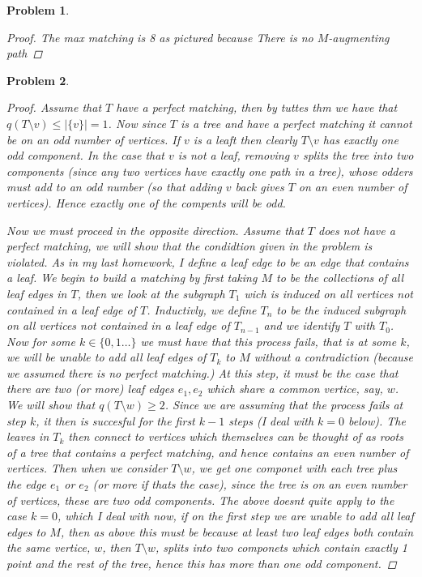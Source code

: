 \documentclass{article}
\newtheorem{prb}{Problem}
\begin{document}
\begin{prb} 
	\begin{proof} 
		The max matching is 8 as pictured because There is no $M$-augmenting path	\end{proof}
\end{prb} 
\newpage
\begin{prb} 
	\begin{proof} 
	Assume that $T$ have a perfect matching, then by tuttes thm we have that $q(T \setminus v) \leq |\{v\}| = 1$. 
	Now since $T$ is a tree and have a perfect matching it cannot be on an odd number of vertices. If $v$ is a leaft 
	then clearly $T \setminus v$ has exactly one odd component. In the case that $v$ is not a leaf, removing $v$ splits the 
	tree into two components (since any two vertices have exactly one path in a tree), whose odders must add to an odd number 
	(so that adding $v$ back gives $T$ on an even number of vertices). Hence exactly one of the compents will be odd. 


	Now we must proceed in the opposite direction. Assume that $T$ does not have a perfect matching, we will show that the condidtion given in the problem is violated. As in my last homework, I define a leaf edge to be an edge that contains a leaf. We begin to build a matching by first taking $M$ to be the collections of all leaf edges in $T$, then we look at the subgraph $T_1$ wich is induced on all vertices not contained in a leaf edge of $T$. 
	Inductivly, we define $T_n$ to be the induced subgraph on all vertices not contained in a leaf edge of $T_{n-1}$ and we identify $T$ with $T_0$. 
	Now for some $k \in \{0, 1 \dots\}$ we must have that this process fails, that is at some $k$, we will be unable to add all leaf edges of $T_k$ to $M$ without a contradiction (because we assumed there is no perfect matching.) At this step, it must be the case that there are two (or more) leaf edges $e_1, e_2$ which 
	share a common vertice, say, $w$. We will show that $q(T \setminus w) \geq 2$. Since we are assuming that the process fails at step $k$, 
	it then is succesful for the first $k-1$ steps (I deal with $k=0$ below). The leaves in $T_k$ then connect to vertices which themselves can be thought of as roots of a tree that contains a perfect matching, and hence contains an even number of vertices. Then when we consider $T \setminus w$, 
we get one componet with each tree plus the edge $e_1$ or $e_2$ (or more if thats the case), since the tree is on an even number of vertices, these are two odd components. The above doesnt quite apply to the case $k =0$, which I deal with now, if on the first step we are unable to add all leaf edges to $M$, then as above this must be because at least two leaf edges both contain the same vertice, $w$, then $T\setminus w$, splits into two componets which contain exactly 1 point and the rest of the tree, hence this has more than one odd component. 
	\end{proof} 

\end{prb} 

\newpage
\end{document}
